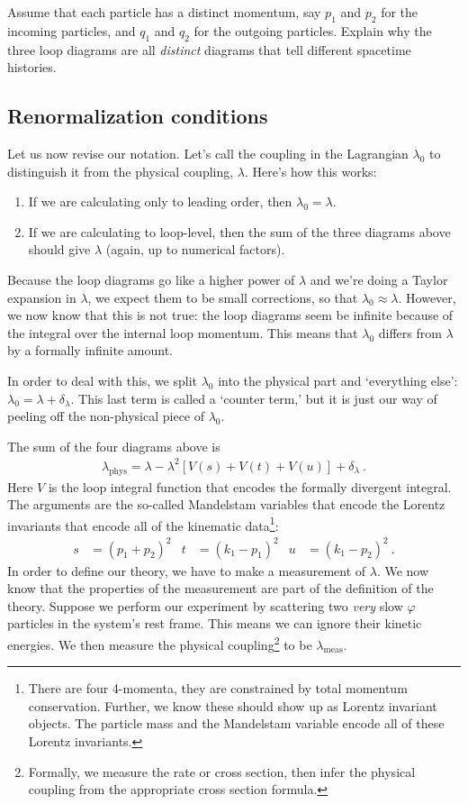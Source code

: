 \documentclass[12pt]{article}
\numberwithin{equation}{section}    %
\begin{document}
Assume that each particle has a distinct momentum, say $p_1$ and $p_2$ for the incoming particles, and $q_1$ and $q_2$ for the outgoing particles. Explain why the three loop diagrams are all \emph{distinct} diagrams that tell different spacetime histories. 

\subsection{Renormalization conditions}

Let us now revise our notation. Let's call the coupling in the Lagrangian $\lambda_0$ to distinguish it from the physical coupling, $\lambda$. Here's how this works:
\begin{enumerate}
	\item If we are calculating only to leading order, then $\lambda_0 = \lambda$.
	\item If we are calculating to loop-level, then the sum of the three diagrams above should give $\lambda$ (again, up to numerical factors). 
\end{enumerate}
Because the loop diagrams go like a higher power of $\lambda$ and we're doing a Taylor expansion in $\lambda$, we expect them to  be small corrections, so that $\lambda_0\approx \lambda$. However, we now know that this is not true: the loop diagrams seem be infinite because of the integral over the internal loop momentum. This means that $\lambda_0$ differs from $\lambda$ by a formally infinite amount. 

In order to deal with this, we split $\lambda_0$ into the physical part and `everything else': $\lambda_0 = \lambda + \delta_\lambda$. This last term is called a `counter term,' but it is just our way of peeling off the non-physical piece of $\lambda_0$. 

The sum of the four diagrams above is
\begin{align}
	\lambda_\text{phys} = \lambda - \lambda^2
	\left[
		V(s)
		+ V(t)
		+ V(u)
	\right]
	+ \delta_\lambda
	 \ .
	\label{eq:defining}
\end{align}
Here $V$ is the loop integral function that encodes the formally divergent integral. The arguments are the so-called Mandelstam variables that encode the Lorentz invariants that encode all of the kinematic data\footnote{There are four 4-momenta, they are constrained by total momentum conservation. Further, we know these should show up as Lorentz invariant objects. The particle mass and the Mandelstam variable encode all of these Lorentz invariants.}:
\begin{align}
	s &= (p_1 + p_2)^2
	&
	t &= (k_1-p_1)^2
	&
	u &= (k_1-p_2)^2 \ .
\end{align}
In order to define our theory, we have to make a measurement of $\lambda$. We now know that the properties of the measurement are part of the definition of the theory. Suppose we perform our experiment by scattering two \emph{very} slow $\varphi$ particles in the system's rest frame. This means we can ignore their kinetic energies. We then measure the physical coupling\footnote{Formally, we measure the rate or cross section, then infer the physical coupling from the appropriate cross section formula.} to be $\lambda_\text{meas}$. 
\end{document}
